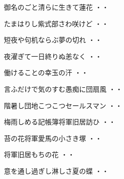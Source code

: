 \begin{shiika}御名のごと清らに生きて蓮花
\hfill{・・}\end{shiika}
\vspace{0.6cm}
\begin{shiika}たまはりし紫式部さわ咲けど
\hfill{・・}\end{shiika}
\vspace{0.6cm}
\begin{shiika}短夜や句机ならぶ夢の切れ
\hfill{・・}\end{shiika}
\vspace{0.6cm}
\begin{shiika}夜濯ぎて一日終りぬ恙なく
\hfill{・・}\end{shiika}
\vspace{0.6cm}
\begin{shiika}働けることの幸玉の汗
\hfill{・・}\end{shiika}
\vspace{0.6cm}
\begin{shiika}言ふだけで気のすむ愚痴に団扇風
\hfill{・・}\end{shiika}
\vspace{0.6cm}
\begin{shiika}階暑し団地こつこつセールスマン
\hfill{・・}\end{shiika}
\vspace{0.6cm}
\begin{shiika}梅雨しめる記帳簿将軍旧居訪ひ
\hfill{・・}\end{shiika}
\vspace{0.6cm}
\begin{shiika}苔の花将軍愛馬の小さき塚
\hfill{・・}\end{shiika}
\vspace{0.6cm}
\begin{shiika}将軍旧居もちの花
\hfill{・・}\end{shiika}
\vspace{0.6cm}
\begin{shiika}意を通し過ぎし淋しさ夏の蝶
\hfill{・・}\end{shiika}
\vspace{0.6cm}
